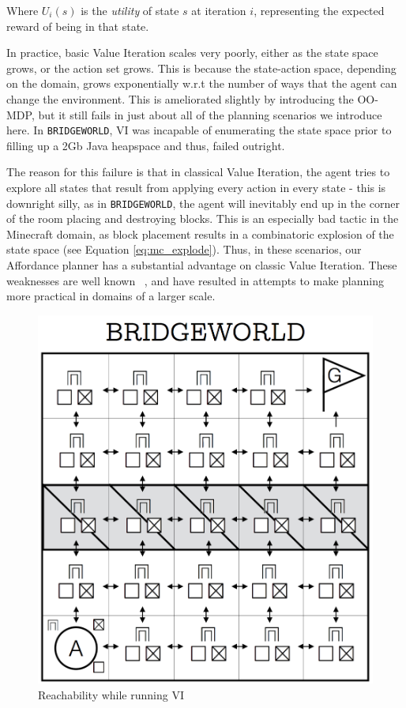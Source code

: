 \documentclass[]{article}
\begin{document}
Where $U_i(s)$ is the {\it utility} of state $s$ at iteration $i$, representing the expected reward of being in that state.

In practice, basic Value Iteration scales very poorly, either as the state space grows, or the action set grows. This is because the state-action space, depending on the domain, grows exponentially w.r.t the number of ways that the agent can change the environment. This is ameliorated slightly by introducing the OO-MDP, but it still fails in just about all of the planning scenarios we introduce here. In \texttt{BRIDGEWORLD}, VI was incapable of enumerating the state space prior to filling up a 2Gb Java heapspace and thus, failed outright.

The reason for this failure is that in classical Value Iteration, the agent tries to explore all states that result from applying every action in every state - this is downright silly, as in \texttt{BRIDGEWORLD}, the agent will inevitably end up in the corner of the room placing and destroying blocks. This is an especially bad tactic in the Minecraft domain, as block placement results in a combinatoric explosion of the state space (see Equation \ref{eq:mc_explode}). Thus, in these scenarios, our Affordance planner has a substantial advantage on classic Value Iteration. These weaknesses are well known ~\citep{grounds05}, and have resulted in attempts to make planning more practical in domains of a larger scale.


\begin{figure}
\centering
\includegraphics[scale = 0.2]{figures/bridgeworld_vi.png}
\caption{Reachability while running VI}
\end{figure}
\end{document}
